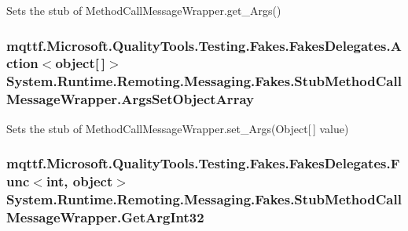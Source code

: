 Sets the stub of Method\-Call\-Message\-Wrapper.\-get\-\_\-\-Args()

\hypertarget{class_system_1_1_runtime_1_1_remoting_1_1_messaging_1_1_fakes_1_1_stub_method_call_message_wrapper_a08baa43cf648ea010a658e14c2c29629}{
\subsubsection[{Args\-Set\-Object\-Array}]{\setlength{\rightskip}{0pt plus 5cm}mqttf.\-Microsoft.\-Quality\-Tools.\-Testing.\-Fakes.\-Fakes\-Delegates.\-Action$<$object\mbox{[}$\,$\mbox{]}$>$ System.\-Runtime.\-Remoting.\-Messaging.\-Fakes.\-Stub\-Method\-Call\-Message\-Wrapper.\-Args\-Set\-Object\-Array}}\label{class_system_1_1_runtime_1_1_remoting_1_1_messaging_1_1_fakes_1_1_stub_method_call_message_wrapper_a08baa43cf648ea010a658e14c2c29629}


Sets the stub of Method\-Call\-Message\-Wrapper.\-set\-\_\-\-Args(\-Object\mbox{[}$\,$\mbox{]} value)

\hypertarget{class_system_1_1_runtime_1_1_remoting_1_1_messaging_1_1_fakes_1_1_stub_method_call_message_wrapper_ad99933b39225e705a6b1424a1ca8ffc0}{
\subsubsection[{Get\-Arg\-Int32}]{\setlength{\rightskip}{0pt plus 5cm}mqttf.\-Microsoft.\-Quality\-Tools.\-Testing.\-Fakes.\-Fakes\-Delegates.\-Func$<$int, object$>$ System.\-Runtime.\-Remoting.\-Messaging.\-Fakes.\-Stub\-Method\-Call\-Message\-Wrapper.\-Get\-Arg\-Int32}}\label{class_system_1_1_runtime_1_1_remoting_1_1_messaging_1_1_fakes_1_1_stub_method_call_message_wrapper_ad99933b39225e705a6b1424a1ca8ffc0}


